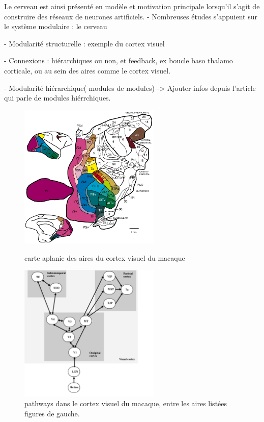 Le cerveau est ainsi présenté en modèle et motivation principale lorsqu'il s'agit de construire des réseaux de neurones artificiels. 
- Nombreuses études s'appuient sur le système modulaire : le cerveau \cite{primate_cortex_91,mountcastle_columnar_1997,binzegger05}

- Modularité structurelle : exemple du cortex visuel

- Connexions : hiérarchiques ou non, et feedback, ex boucle baso thalamo corticale, ou au sein des aires comme le cortex visuel.

- Modularité hiérarchique( modules de modules) -> Ajouter infos depuis l'article qui parle de modules hiérrchiques. 


\begin{figure}
\begin{minipage}{0.5\textwidth}
\centering
\includegraphics[width=0.6\textwidth]{FVE_fig2map.png}
\caption{carte aplanie des aires du cortex visuel du macaque \cite{primate_cortex_91}}
\label{fig:cortex1}
\end{minipage}
\begin{minipage}{0.5\textwidth}
\centering
\includegraphics[width=0.6\textwidth]{rolls_pathways.pdf}
\caption{pathways dans le cortex visuel du macaque, entre les aires listées figures de gauche. \cite{Rolls2002ComputationalNO}}
\label{fig:cortex2}
\end{minipage}
\end{figure}


